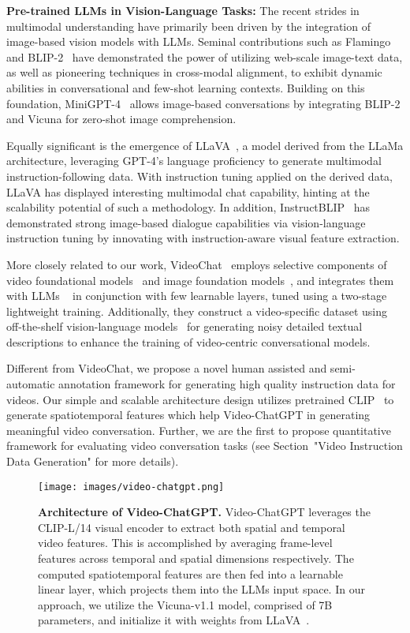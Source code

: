 \noindent \textbf{Pre-trained LLMs in Vision-Language Tasks:} The recent strides in multimodal understanding have primarily been driven by the integration of image-based vision models with LLMs. Seminal contributions such as Flamingo~\cite{Alayrac2022Flamingo} and BLIP-2~\cite{blip-2} have demonstrated the power of utilizing web-scale image-text data, as well as pioneering techniques in cross-modal alignment, to exhibit dynamic abilities in conversational and few-shot learning contexts. Building on this foundation, MiniGPT-4~\cite{zhu2023minigpt} allows image-based conversations by integrating BLIP-2 and Vicuna for zero-shot image comprehension.

Equally significant is the emergence of LLaVA~\cite{liu2023llava}, a model derived from the LLaMa architecture, leveraging GPT-4's language proficiency to generate multimodal instruction-following data. With instruction tuning applied on the derived data, LLaVA has displayed interesting multimodal chat capability, hinting at the scalability potential of such a methodology. In addition, InstructBLIP~\cite{instructblip} has demonstrated strong image-based dialogue capabilities via vision-language instruction tuning by innovating with instruction-aware visual feature extraction.

More closely related to our work, VideoChat~\cite{2023videochat} employs selective components of video foundational models~\cite{wang2022internvideo} and image foundation models~\cite{blip-2}, and integrates them with LLMs ~\cite{vicuna2023} in conjunction with few learnable layers, tuned using a two-stage lightweight training. Additionally, they construct a video-specific dataset using off-the-shelf vision-language models~\cite{wu2022grit, blip-2, huang2023tag2text, wang2022internvideo} for generating noisy detailed textual descriptions to enhance the training of video-centric conversational models.

Different from VideoChat, we propose a novel human assisted and semi-automatic annotation framework for generating high quality instruction data for videos. Our simple and scalable architecture design utilizes pretrained CLIP~\cite{radford2021learning} to generate spatiotemporal features which help Video-ChatGPT in generating meaningful video conversation. Further, we are the first to propose quantitative framework for evaluating video conversation tasks (see Section~"Video Instruction Data Generation" for more details).

\begin{figure*}[t]
  \centering
  \texttt{[image: images/video-chatgpt.png]}
  \caption{\textbf{Architecture of Video-ChatGPT.} Video-ChatGPT leverages the CLIP-L/14 visual encoder to extract both spatial and temporal video features. This is accomplished by averaging frame-level features across temporal and spatial dimensions respectively. The computed spatiotemporal features are then fed into a learnable linear layer, which projects them into the LLMs input space. In our approach, we utilize the Vicuna-v1.1 model, comprised of 7B parameters, and initialize it with weights from LLaVA~\cite{liu2023llava}.}
  \label{fig:arch}
\end{figure*}


